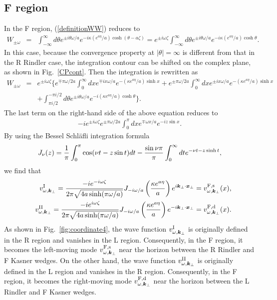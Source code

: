 \documentclass[aps,prd,preprintnumbers,nofootinbib,showpacs,11pt]{revtex4}%
\begin{document}
\begin{widetext}
\subsection{F region}
In the F region, 
 (\ref{definitionWW}) reduces to 
\begin{eqnarray}
W_{\pm \omega}&=&\int_{-\infty}^{\infty} {d\theta }e^{\pm i\theta\omega/a} e^{-i\kappa (e^{a\eta}/a)\cosh (\theta-a\zeta) }
=e^{\pm i\omega\zeta}\int_{-\infty}^{\infty} {d\theta }e^{\pm i\theta\omega/a} e^{-i\kappa (e^{a\eta}/a)\cosh \theta }.
\label{definitionWF}
\end{eqnarray}
In this case, because the convergence property at $|\theta|=\infty$ is different from that in the R Rindler case,
 the integration contour can be shifted on the complex plane, as shown in Fig.~\ref{CPcont}. 
Then the integration is rewritten as
\begin{eqnarray}
W_{\pm \omega}&=&e^{\pm i\omega\zeta}\biggl\{
e^{\mp \pi\omega/2a}\int_0^\infty dx e^{\mp ix\omega/a} e^{-(\kappa e^{a\eta}/a)\sinh x}
+e^{\pm \pi\omega/2a}\int_0^\infty dx e^{\pm ix\omega/a} e^{-(\kappa e^{a\eta}/a)\sinh x}
\nonumber
\\
&&+\int_{\pi i/2}^{-\pi i/2} d\theta e^{\pm i\theta \omega/a} e^{-i(\kappa e^{a\eta}/a)\cosh\theta}\biggr\}.
\end{eqnarray}
The last term on the right-hand side of the above equation reduces to 
\begin{eqnarray}
-i e^{\pm i\omega\zeta} e^{\pm \pi \omega/2a}\int _0^\pi dx e^{\mp \omega x/a} e^{-iz\sin x}. 
\end{eqnarray}
By using the Bessel Schl\"afli integration formula 
\begin{eqnarray}
J_\nu(z)={1\over \pi} \int_0^\pi \cos(\nu t-z\sin t) dt-{\sin\nu\pi\over \pi}
\int_0^\infty dt e^{-\nu t-z\sinh t},
\end{eqnarray}
we find that 
\begin{eqnarray}
&&v^{{\rm I}}_{\omega,\bm k_\perp}=
{-ie^{-i\omega\zeta}\over 2\pi\sqrt{4a\sinh (\pi \omega/a)}}
J_{-i\omega/a}\left({\kappa e^{a\eta}\over a}\right)
e^{i\bm k_\perp\cdot \bm x_\perp}=v_{\omega,{\bm k}_\perp}^{{\rm F},{\rm s}}(x),
\\
&&v^{{\rm II}}_{\omega,\bm k_\perp}=
{-ie^{i\omega\zeta}\over 2\pi\sqrt{4a\sinh (\pi \omega/a)}}
J_{-i\omega/a}\left({\kappa e^{a\eta}\over a}\right)
e^{-i\bm k_\perp\cdot \bm x_\perp}
=v_{\omega,{\bm k}_\perp}^{{\rm F},{\rm d}}(x).
\end{eqnarray}
As shown in Fig.~\ref{fig:coordinate4},
the wave function $v^{\rm I}_{\omega,\bm k_\perp}$ is originally defined in the R region and vanishes in the L region.
Consequently, in the F region, it becomes the left-moving mode $v^{\rm F, s}_{\omega,\bm k_\perp}$
near the horizon between the R Rindler and F Kasner wedges.
On the other hand, the wave 
function $v^{\rm II}_{\omega,\bm k_\perp}$ is originally defined in the L region and vanishes in the R region.
Consequently, in the F region, it becomes the right-moving mode $v^{\rm F, d}_{\omega,\bm k_\perp}$
near the horizon between the L Rindler and F Kasner wedges.


\end{widetext}
\end{document}
